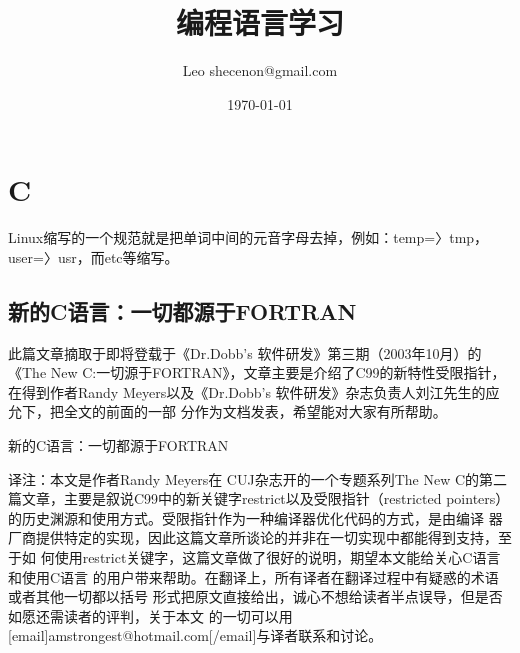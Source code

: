\documentclass[a4paper,11pt]{book}
\title{编程语言学习}
\author{Leo shecenon@gmail.com}
\date{\today}
\begin{document}
\maketitle
\renewcommand\contentsname{目录}
\renewcommand\listfigurename{插图目录}
\renewcommand\listtablename{表格目录}
\renewcommand\indexname{索引}
\renewcommand\appendixname{附录}
\renewcommand\figurename{图}
\renewcommand\tablename{表}
\renewcommand{\lstlistlistingname}{代码列表集}
\renewcommand{\lstlistingname}{代码}

\setlength{\columnsep}{.8cm}
\setlength{\parskip}{1ex}
\tableofcontents
\newcommand{\various}[1]{{\color{cyan}\textit{#1}}}
\newcommand{\binder}{{\color{red}binder }}

\setlength{\leftmargin}{1.2em}     %
\setlength{\parsep}{0ex}         %
\setlength{\topsep}{1ex}         %
\setlength{\itemsep}{0.5ex}        %
\setlength{\labelsep}{0.3em}     %
\setlength{\itemindent}{1.1em}    %
\setlength{\listparindent}{0em} %

\printindex

\chapter{C}
Linux缩写的一个规范就是把单词中间的元音字母去掉，例如：temp=〉tmp， 
user=〉usr，而etc等缩写。

\section{新的C语言：一切都源于FORTRAN}
此篇文章摘取于即将登载于《Dr.Dobb's 软件研发》第三期（2003年10月）的《The New
C:一切源于FORTRAN》，文章主要是介绍了C99的新特性受限指针，在得到作者Randy
Meyers以及《Dr.Dobb's 软件研发》杂志负责人刘江先生的应允下，把全文的前面的一部
分作为文档发表，希望能对大家有所帮助。

新的C语言：一切都源于FORTRAN

译注：本文是作者Randy Meyers在 CUJ杂志开的一个专题系列The New
C的第二篇文章，主要是叙说C99中的新关键字restrict以及受限指针（restricted
pointers）的历史渊源和使用方式。受限指针作为一种编译器优化代码的方式，是由编译
器厂商提供特定的实现，因此这篇文章所谈论的并非在一切实现中都能得到支持，至于如
何使用restrict关键字，这篇文章做了很好的说明，期望本文能给关心C语言和使用C语言
的用户带来帮助。在翻译上，所有译者在翻译过程中有疑惑的术语或者其他一切都以括号
形式把原文直接给出，诚心不想给读者半点误导，但是否如愿还需读者的评判，关于本文
的一切可以用[email]amstrongest@hotmail.com[/email]与译者联系和讨论。
\end{document}
